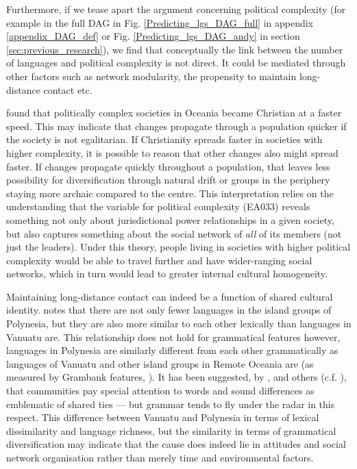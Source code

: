 \documentclass[unnumsec,webpdf,modern,medium]{oup-authoring-template}
\begin{document}
Furthermore, if we tease apart the argument concerning political complexity (for example in the full DAG in Fig. \ref{Predicting_lgs_DAG_full} in appendix \ref{appendix_DAG_def} or Fig. \ref{Predicting_lgs_DAG_andy} in section \ref{sec:previous_research}), we find that conceptually the link between the number of languages and political complexity is not direct. It could be mediated through other factors such as network modularity, the propensity to maintain long-distance contact etc. 

\citet{watts_2018} found that politically complex societies in Oceania became Christian at a faster speed. This may indicate that changes propagate through a population quicker if the society is not egalitarian. If Christianity spreads faster in societies with higher complexity, it is possible to reason that other changes also might spread faster. If changes propagate quickly throughout a population, that leaves less possibility for diversification through natural drift or groups in the periphery staying more archaic compared to the centre. This interpretation relies on the understanding that the variable for political complexity (EA033) reveals something not only about jurisdictional power relationships in a given society, but also captures something about the social network of \emph{all} of its members (not just the leaders). Under this theory, people living in societies with higher political complexity would be able to travel further and have wider-ranging social networks, which in turn would lead to greater internal cultural homogeneity.

Maintaining long-distance contact can indeed be a function of shared cultural identity. \citet[218-291]{skirgaard2020multilevel} notes that there are not only fewer languages in the island groups of Polynesia, but they are also more similar to each other lexically than languages in Vanuatu are. This relationship does not hold for grammatical features however, languages in Polynesia are similarly different from each other grammatically as languages of Vanuatu and other island groups in Remote Oceania are (as measured by Grambank features, \citep{grambank_release}). It has been suggested, by \citet{silverstein1981limits}, \citet{francois2011} and others (c.f. \citet{mansfield2023dialect}), that communities pay special attention to words and sound differences as emblematic of shared ties --- but grammar tends to fly under the radar in this respect. This difference between Vanuatu and Polynesia in terms of lexical dissimilarity and language richness, but the similarity in terms of grammatical diversification may indicate that the cause does indeed lie in attitudes and social network organisation rather than merely time and environmental factors.
\end{document}
